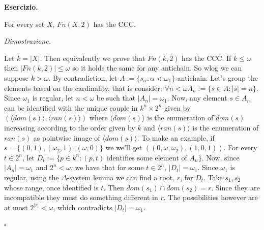 \documentclass[a4paper,12pt]{article}
\newenvironment{exercise}
  {\par\vspace{1em}\noindent\textbf{Esercizio.} }
  {\par\vspace{1em}}
\newenvironment{proof}
  {\par\vspace{0.5em}\noindent\textit{Dimostrazione.} }
  {\par\vspace{1em}\hfill$\square$}
\begin{document}
\begin{exercise}

	For every set $X$, $Fn(X,2)$ has the CCC.

\end{exercise}

\begin{proof}

	Let $k= |X|$. Then equivalently we prove that $Fn(k,2)$ has the CCC.
	If $k \leq \omega$ then $|Fn(k,2)| \leq \omega$ so it holds the same for any antichain.
	So wlog we can suppose $k > \omega$.
	By contradiction, let $A:=\{s_{\alpha} : \alpha < \omega_1\}$ antichain.
	Let's group the elements based on the cardinality, that is consider:
	$\forall n<\omega A_n := \{s \in A : |s|= n\}$.
	Since $\omega_1$ is regular, let $n<\omega$ be such that $|A_n| = \omega_1$.
	Now, any element $s \in A_n$ can be identified with the unique couple in $k^n \times 2^n$ given by $(\langle dom(s) \rangle, \langle ran(s) \rangle)$ 
	where $\langle dom(s) \rangle$ is the enumeration of $dom(s)$ increasing according to the order given by $k$ and $\langle ran(s) \rangle$ is the enumeration of $ran(s)$ as pointwise image of $\langle dom(s) \rangle$.
	To make an example, if $s = \{ (0,1), (\omega_2,1), (\omega,0) \}$ we we'll get $((0,\omega,\omega_2),(1,0,1))$.
	For every $t \in 2^n$, let $D_t := \{p \in k^n: (p,t) \text{ identifies some element of }A_n\}$.
	Now, since $|A_n| = \omega_1$ and $2^n < \omega$, we have that for some $t \in 2^n$, $|D_t| = \omega_1$.
	Since $\omega_1$ is regular, using the $\Delta$-system lemma we can find a root, $r$, for $D_t$.
	Take $s_1, s_2$ whose range, once identified is $t$. Then $dom(s_1) \cap dom(s_2) = r$.
	Since they are incompatible they must do something different in $r$.
	The possibilities however are at most $2^{|r|} < \omega$, which contradicts $|D_t| = \omega_1$.

\end{proof}
\end{document}
